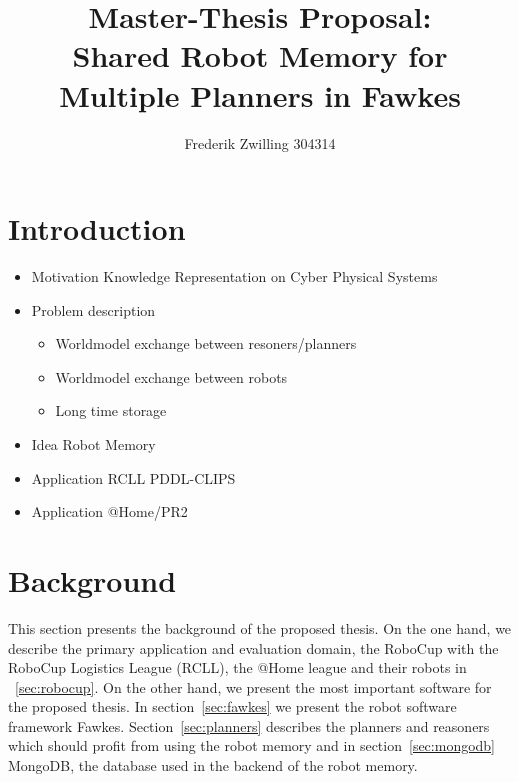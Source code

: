 \documentclass[a4paper,11pt]{article}
\author{Frederik Zwilling 304314}
\title{Master-Thesis Proposal:\\ Shared Robot Memory for Multiple Planners in Fawkes}
\begin{document}
\maketitle


\section{Introduction}
\label{sec:introduction}
\begin{itemize}
\item Motivation Knowledge Representation on Cyber Physical Systems
\item Problem description
  \begin{itemize}
  \item Worldmodel exchange between resoners/planners
  \item Worldmodel exchange between robots
  \item Long time storage
  \end{itemize}
\item Idea Robot Memory
\item Application RCLL PDDL-CLIPS
\item Application @Home/PR2
\end{itemize}

\section{Background}
\label{sec:background}
This section presents the background of the proposed thesis. On the
one hand, we describe the primary application and evaluation domain,
the RoboCup with the RoboCup Logistics League (RCLL), the @Home league
and their robots in ~\ref{sec:robocup}. On the other hand, we present
the most important software for the proposed thesis. In
section~\ref{sec:fawkes} we present the robot software framework
Fawkes. Section~\ref{sec:planners} describes the planners and
reasoners which should profit from using the robot memory and in
section~\ref{sec:mongodb} MongoDB, the database used in the backend of
the robot memory.
\end{document}

